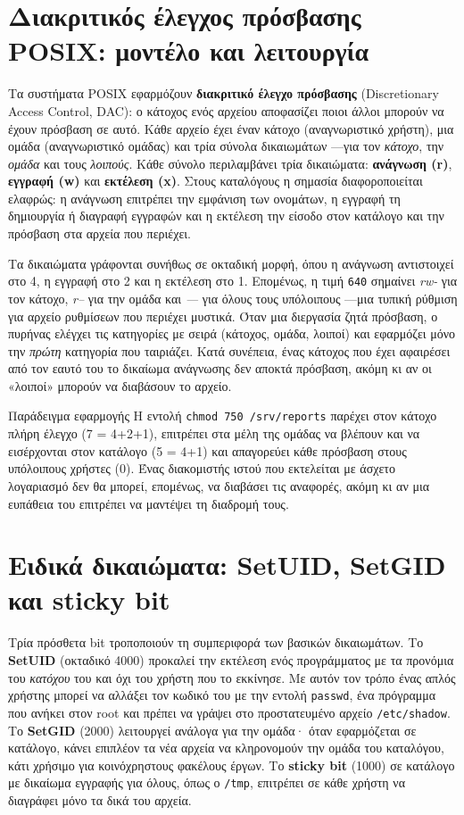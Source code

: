 \documentclass[11pt,openany]{book}
\begin{document}
\section{Διακριτικός έλεγχος πρόσβασης POSIX: μοντέλο και λειτουργία}\label{sec:2.1}
Τα συστήματα POSIX εφαρμόζουν \textbf{διακριτικό έλεγχο πρόσβασης} (Discretionary Access Control, DAC): ο κάτοχος ενός αρχείου αποφασίζει ποιοι άλλοι μπορούν να έχουν πρόσβαση σε αυτό. Κάθε αρχείο έχει έναν κάτοχο (αναγνωριστικό χρήστη), μια ομάδα (αναγνωριστικό ομάδας) και τρία σύνολα δικαιωμάτων —για τον \emph{κάτοχο}, την \emph{ομάδα} και τους \emph{λοιπούς}. Κάθε σύνολο περιλαμβάνει τρία δικαιώματα: \textbf{ανάγνωση (r)}, \textbf{εγγραφή (w)} και \textbf{εκτέλεση (x)}. Στους καταλόγους η σημασία διαφοροποιείται ελαφρώς: η ανάγνωση επιτρέπει την εμφάνιση των ονομάτων, η εγγραφή τη δημιουργία ή διαγραφή εγγραφών και η εκτέλεση την είσοδο στον κατάλογο και την πρόσβαση στα αρχεία που περιέχει.

Τα δικαιώματα γράφονται συνήθως σε οκταδική μορφή, όπου η ανάγνωση αντιστοιχεί στο 4, η εγγραφή στο 2 και η εκτέλεση στο 1. Επομένως, η τιμή \texttt{640} σημαίνει \emph{rw-} για τον κάτοχο, \emph{r--} για την ομάδα και \emph{---} για όλους τους υπόλοιπους —μια τυπική ρύθμιση για αρχείο ρυθμίσεων που περιέχει μυστικά. Όταν μια διεργασία ζητά πρόσβαση, ο πυρήνας ελέγχει τις κατηγορίες με σειρά (κάτοχος, ομάδα, λοιποί) και εφαρμόζει μόνο την \emph{πρώτη} κατηγορία που ταιριάζει. Κατά συνέπεια, ένας κάτοχος που έχει αφαιρέσει από τον εαυτό του το δικαίωμα ανάγνωσης δεν αποκτά πρόσβαση, ακόμη κι αν οι «λοιποί» μπορούν να διαβάσουν το αρχείο.

\begin{examplebox}{Παράδειγμα εφαρμογής}
Η εντολή \texttt{chmod 750 /srv/reports} παρέχει στον κάτοχο πλήρη έλεγχο (7 = 4+2+1), επιτρέπει στα μέλη της ομάδας να βλέπουν και να εισέρχονται στον κατάλογο (5 = 4+1) και απαγορεύει κάθε πρόσβαση στους υπόλοιπους χρήστες (0). Ένας διακομιστής ιστού που εκτελείται με άσχετο λογαριασμό δεν θα μπορεί, επομένως, να διαβάσει τις αναφορές, ακόμη κι αν μια ευπάθεια του επιτρέπει να μαντέψει τη διαδρομή τους.
\end{examplebox}

\section{Ειδικά δικαιώματα: SetUID, SetGID και sticky bit}\label{sec:2.2}
Τρία πρόσθετα bit τροποποιούν τη συμπεριφορά των βασικών δικαιωμάτων. Το \textbf{SetUID} (οκταδικό 4000) προκαλεί την εκτέλεση ενός προγράμματος με τα προνόμια του \emph{κατόχου} του και όχι του χρήστη που το εκκίνησε. Με αυτόν τον τρόπο ένας απλός χρήστης μπορεί να αλλάξει τον κωδικό του με την εντολή \texttt{passwd}, ένα πρόγραμμα που ανήκει στον root και πρέπει να γράψει στο προστατευμένο αρχείο \texttt{/etc/shadow}. Το \textbf{SetGID} (2000) λειτουργεί ανάλογα για την ομάδα· όταν εφαρμόζεται σε κατάλογο, κάνει επιπλέον τα νέα αρχεία να κληρονομούν την ομάδα του καταλόγου, κάτι χρήσιμο για κοινόχρηστους φακέλους έργων. Το \textbf{sticky bit} (1000) σε κατάλογο με δικαίωμα εγγραφής για όλους, όπως ο \texttt{/tmp}, επιτρέπει σε κάθε χρήστη να διαγράφει μόνο τα δικά του αρχεία.
\end{document}
